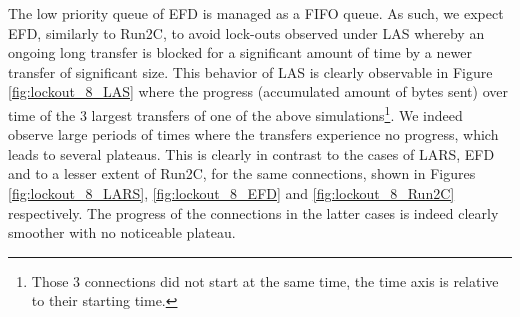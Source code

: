 \documentclass[preprint,12pt]{elsarticle}
\begin{document}
The low priority queue of EFD is managed as a FIFO queue. As such, we expect EFD, similarly to Run2C, to avoid lock-outs observed under LAS whereby an ongoing long transfer is blocked for a significant amount of time by a newer transfer of significant size. This behavior of LAS is clearly observable in Figure \ref{fig:lockout_8_LAS} where the progress (accumulated amount of bytes sent) over time of the 3 largest transfers of one of the above simulations\footnote{Those 3 connections did not start at the same time, the time axis is relative to their starting time.}. We indeed observe large periods of times where the transfers experience no progress, which leads to several plateaus. This is clearly in contrast to the cases of LARS, EFD and to a lesser extent of Run2C, for the same connections, shown in  Figures \ref{fig:lockout_8_LARS}, \ref{fig:lockout_8_EFD} and  \ref{fig:lockout_8_Run2C}  respectively. The progress of the connections in the latter cases is indeed clearly smoother with no noticeable plateau. 
\end{document}
